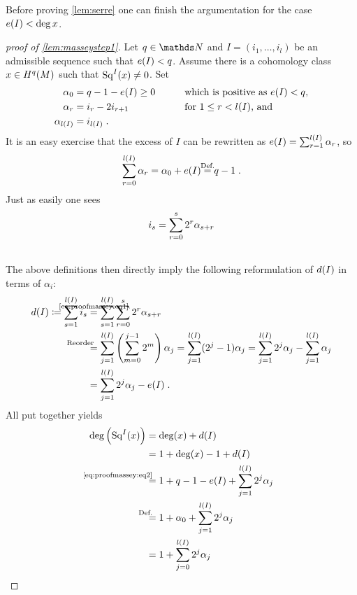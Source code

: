 Before proving \autoref{lem:serre} one can finish the argumentation for
the case $e(I)<\deg x$.
\begin{proof}[proof of \autoref{lem:masseystep1}]
  Let $q\in\Nat$ and $I=(i_1,\dotsc,i_l)$ be an admissible sequence such that
  $e(I)<q$.
  Assume there is a cohomology class $x\in H^q(M)$ such that $\mathrm{Sq}^{I}(x)\neq0$.
  Set
  \begin{alignat*}{4}
    \alpha_0 &= q-1-e(I)\geq 0 &\qquad&\text{which is positive as $e(I)<q$,} \\
    \alpha_r &= i_{r}-2i_{r+1}  &&\text{for $1\leq r< l(I)$, and} \\ 
    \alpha_{l(I)} &= i_{l(I)}
    \;.
  \end{alignat*}
  It is an easy exercise that the excess of $I$ can be rewritten as
  $e(I)=\sum_{r=1}^{l(I)}\alpha_r$, so
  \begin{gather}\label{eq:alpha0}
    \sum_{r=0}^{\l(I)}\alpha_r = \alpha_0 + \e(I) \cequalsby{Def.} q-1
    \;.
  \end{gather}
  Just as easily one sees
  \begin{align}\label{eq:proofmassey:eq1}
    i_s
    &= \sum_{r=0}^{s}2^r\alpha_{s+r}\\\notag
  \end{align}
  The above definitions then directly imply the following reformulation
  of $d(I)$ in terms of $\alpha_i$:
  \begin{align}\notag
    \d(I) \coloneqq \sum_{s=1}^{\l(I)}i_s 
    &\cequalsby{\eqref{eq:proofmassey:eq1}}
      \sum_{s=1}^{\l(I)}\sum_{r=0}^{s}2^r\alpha_{s+r}\\\notag
    &\equalsby{Reorder} \sum_{j=1}^{\l(I)}
      \left(\sum_{m=0}^{j-1}2^m\right)\alpha_j
      = \sum_{j=1}^{\l(I)}(2^j-1)\alpha_j 
      = \sum_{j=1}^{\l(I)}2^j\alpha_j
      - \sum_{j=1}^{\l(I)}\alpha_j\\
    \label{eq:proofmassey:eq2}
    &= \sum_{j=1}^{\l(I)}2^j\alpha_j
      - \e(I)
      \;.
  \end{align}
  All put together yields
  \begin{align*}
    \deg\left(\Sq I(x)\right)
    &= \deg(x) + \d(I)\\
    &= 1 + \deg(x) -1 +\d(I) \\
    &\equalsby{\eqref{eq:proofmassey:eq2}}
      1 + q - 1 - \e(I) + \sum_{j=1}^{\l(I)}2^j\alpha_j \\
    &\equalsby{Def.}
      1 + \alpha_0 + \sum_{j=1}^{\l(I)}2^j\alpha_j \\
    &= 1 + \sum_{j=0}^{\l(I)}2^j\alpha_j

\end{align*}
\end{proof}
